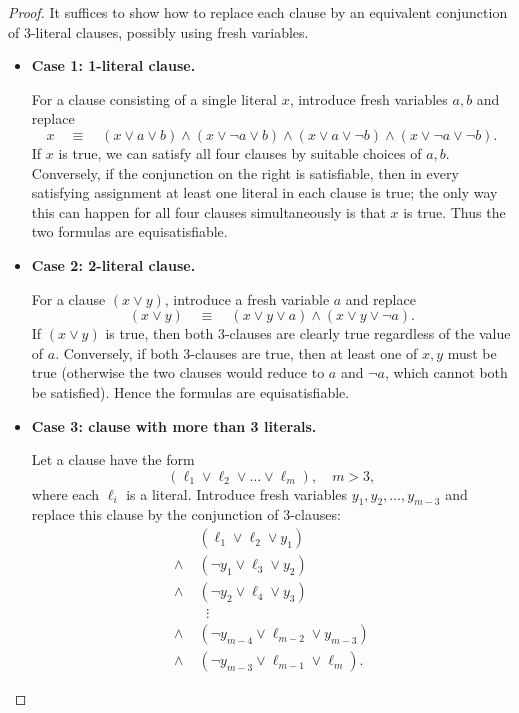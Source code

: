 \documentclass[9pt]{extarticle}
\begin{document}
\begin{proof}
  It suffices to show how to replace each clause by an equivalent conjunction
  of 3-literal clauses, possibly using fresh variables.

  \begin{itemize}
    \item \textbf{Case 1: 1-literal clause.}

    For a clause consisting of a single literal \(x\), introduce fresh variables
    \(a,b\) and replace
    \[
      x \quad\equiv\quad
      (x \lor a \lor b) \land (x \lor \neg a \lor b) \land (x \lor a \lor \neg b) \land (x \lor \neg a \lor \neg b).
    \]
    If \(x\) is true, we can satisfy all four clauses by suitable choices of
    \(a,b\). Conversely, if the conjunction on the right is satisfiable, then
    in every satisfying assignment at least one literal in each clause is true;
    the only way this can happen for all four clauses simultaneously is that
    \(x\) is true. Thus the two formulas are equisatisfiable.

    \item \textbf{Case 2: 2-literal clause.}

    For a clause \((x \lor y)\), introduce a fresh variable \(a\) and replace
    \[
      (x \lor y) \quad\equiv\quad (x \lor y \lor a) \land (x \lor y \lor \neg a).
    \]
    If \((x \lor y)\) is true, then both 3-clauses are clearly true regardless
    of the value of \(a\). Conversely, if both 3-clauses are true, then at least
    one of \(x,y\) must be true (otherwise the two clauses would reduce to
    \(a\) and \(\neg a\), which cannot both be satisfied). Hence the formulas
    are equisatisfiable.

    \item \textbf{Case 3: clause with more than 3 literals.}

    Let a clause have the form
    \[
      ( \ell_1 \lor \ell_2 \lor \dots \lor \ell_m ), \quad m > 3,
    \]
    where each \(\ell_i\) is a literal. Introduce fresh variables
    \(y_1, y_2, \dots, y_{m-3}\) and replace this clause by the conjunction
    of 3-clauses:
    \begin{align*}
      &(\ell_1 \lor \ell_2 \lor y_1) \\
      \land\;&(\neg y_1 \lor \ell_3 \lor y_2) \\
      \land\;&(\neg y_2 \lor \ell_4 \lor y_3) \\
      &\;\;\vdots \\
      \land\;&(\neg y_{m-4} \lor \ell_{m-2} \lor y_{m-3}) \\
      \land\;&(\neg y_{m-3} \lor \ell_{m-1} \lor \ell_m).
    \end{align*}


\end{itemize}
\end{proof}
\end{document}

